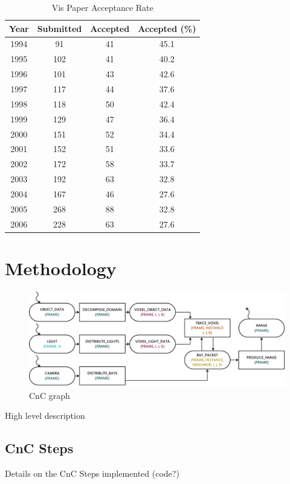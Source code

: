 \documentclass{vgtc}                          %
\begin{document}
\begin{table}
  \caption{Vis Paper Acceptance Rate}
  \label{vis_accept}
  \scriptsize
  \begin{center}
    \begin{tabular}{cccc}
      Year & Submitted & Accepted & Accepted (\%)\\
    \hline
      1994 &  91 & 41 & 45.1\\
      1995 & 102 & 41 & 40.2\\
      1996 & 101 & 43 & 42.6\\
      1997 & 117 & 44 & 37.6\\
      1998 & 118 & 50 & 42.4\\
      1999 & 129 & 47 & 36.4\\
      2000 & 151 & 52 & 34.4\\
      2001 & 152 & 51 & 33.6\\
      2002 & 172 & 58 & 33.7\\
      2003 & 192 & 63 & 32.8\\
      2004 & 167 & 46 & 27.6\\
      2005 & 268 & 88 & 32.8\\
      2006 & 228 & 63 & 27.6
    \end{tabular}
  \end{center}
\end{table}

\section{Methodology}

\begin{figure}[htb]
  \centering
  \includegraphics[width=\textwidth]{./../img/CnC.pdf}
  \caption{CnC graph}
\end{figure}

High level description

\subsection{CnC Steps}
Details on the CnC Steps implemented (code?)
\end{document}
